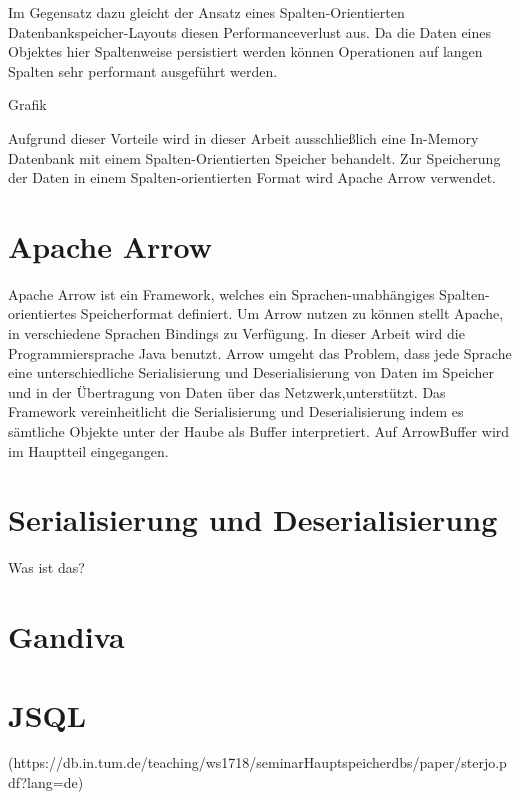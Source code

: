 Im Gegensatz dazu gleicht der Ansatz eines Spalten-Orientierten Datenbankspeicher-Layouts diesen Performanceverlust aus. 
Da die Daten eines Objektes hier Spaltenweise persistiert werden können Operationen auf langen Spalten sehr performant ausgeführt werden.

Grafik

Aufgrund dieser Vorteile wird in dieser Arbeit ausschließlich eine In-Memory Datenbank mit einem Spalten-Orientierten Speicher behandelt.
Zur Speicherung der Daten in einem Spalten-orientierten Format wird Apache Arrow verwendet.

\section{Apache Arrow}

Apache Arrow ist ein Framework, welches ein Sprachen-unabhängiges Spalten-orientiertes Speicherformat definiert. 
Um Arrow nutzen zu können stellt Apache, in verschiedene Sprachen Bindings zu Verfügung. In dieser Arbeit wird die Programmiersprache Java benutzt.
Arrow umgeht das Problem, dass jede Sprache eine unterschiedliche Serialisierung und Deserialisierung von Daten im Speicher und in der Übertragung von Daten über das Netzwerk,unterstützt.
Das Framework vereinheitlicht die Serialisierung und Deserialisierung indem es sämtliche Objekte unter der Haube als Buffer interpretiert.
Auf ArrowBuffer wird im Hauptteil eingegangen.


\section{Serialisierung und Deserialisierung}

Was ist das?

\section{Gandiva}

\section{JSQL}


 



(https://db.in.tum.de/teaching/ws1718/seminarHauptspeicherdbs/paper/sterjo.pdf?lang=de)